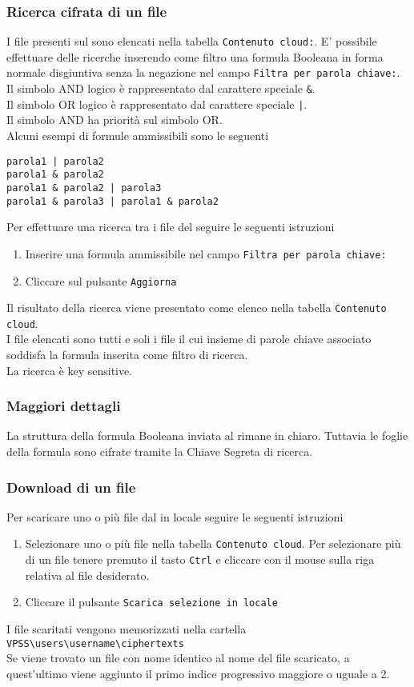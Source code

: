 \documentclass[a4paper,twoside,10pt,openany]{scrbook}
\begin{document}
\subsubsection{Ricerca cifrata di un file}\label{sec:search}
%
I file presenti sul \sa sono elencati nella tabella \texttt{Contenuto cloud:}.
E' possibile effettuare delle ricerche inserendo come filtro una formula Booleana in forma normale disgiuntiva senza la negazione nel campo \texttt{Filtra per parola chiave:}. \\
Il simbolo AND logico è rappresentato dal carattere speciale \texttt{\&}.\\
Il simbolo OR logico è rappresentato dal carattere speciale \texttt{|}.\\
Il simbolo AND ha priorità sul simbolo OR.\\
Alcuni esempi di formule ammissibili sono le seguenti
\begin{verbatim}
parola1 | parola2
parola1 & parola2
parola1 & parola2 | parola3
parola1 & parola3 | parola1 & parola2
\end{verbatim}
Per effettuare una ricerca tra i file del \sa seguire le seguenti istruzioni
\begin{enumerate}
 \item Inserire una formula ammissibile nel campo \texttt{Filtra per parola chiave:}
 \item Cliccare sul pulsante \texttt{Aggiorna}
\end{enumerate}
Il risultato della ricerca viene presentato come elenco nella tabella \texttt{Contenuto cloud}.\\
I file elencati sono tutti e soli i file il cui insieme di parole chiave associato soddisfa la formula inserita come filtro di ricerca.\\
La ricerca è key sensitive.
%
\subsubsection*{Maggiori dettagli}
%
La struttura della formula Booleana inviata al \sr rimane in chiaro.
Tuttavia le foglie della formula sono cifrate tramite la Chiave Segreta di ricerca.
%
\subsubsection{Download di un file}\label{sec:download}
%
Per scaricare uno o più file dal \sa in locale seguire le seguenti istruzioni
\begin{enumerate}
 \item Selezionare uno o più file nella tabella \texttt{Contenuto cloud}. Per selezionare più di un file tenere premuto il tasto \texttt{Ctrl} e cliccare con il mouse sulla riga relativa al file desiderato.
 \item Cliccare il pulsante \texttt{Scarica selezione in locale}
\end{enumerate}
I file scaritati vengono memorizzati nella cartella\\
\texttt{VPSS\textbackslash users\textbackslash username\textbackslash ciphertexts}\\
Se viene trovato un file con nome identico al nome del file scaricato, a quest'ultimo viene aggiunto il primo indice progressivo maggiore o uguale a 2.
%
\end{document}
